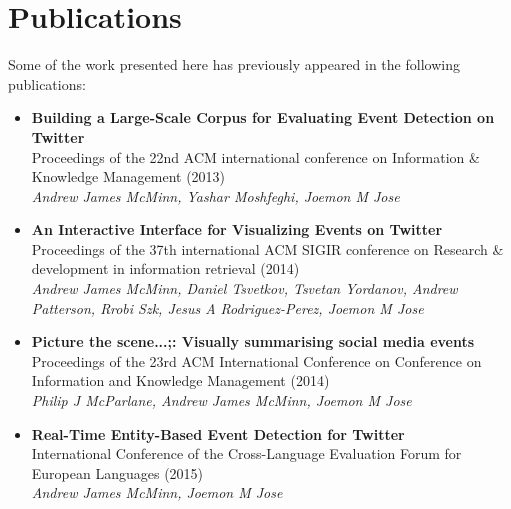 
\chapter*{Publications}
Some of the work presented here  has previously appeared in the following publications:

\bigskip

\begin{itemize}
	\item{
		\textbf{Building a Large-Scale Corpus for Evaluating Event Detection on Twitter}\\
		Proceedings of the 22nd ACM international conference on Information \& Knowledge Management (2013)\\
		\textit{Andrew James McMinn, Yashar Moshfeghi, Joemon M Jose}
	}

	\vspace{0.75cm}

	\item{
		\textbf{An Interactive Interface for Visualizing Events on Twitter}\\
		Proceedings of the 37th international ACM SIGIR conference on Research \& development in information retrieval (2014)\\
		\textit{Andrew James McMinn, Daniel Tsvetkov, Tsvetan Yordanov, Andrew Patterson, Rrobi Szk, Jesus A Rodriguez-Perez, Joemon M Jose}
	}

	\vspace{0.75cm}

	\item{
		\textbf{Picture the scene...;: Visually summarising social media events}\\
		Proceedings of the 23rd ACM International Conference on Conference on Information and Knowledge Management (2014)\\
		\textit{Philip J McParlane, Andrew James McMinn, Joemon M Jose}
	}

	\vspace{0.75cm}

	\item{
		\textbf{Real-Time Entity-Based Event Detection for Twitter}\\
		International Conference of the Cross-Language Evaluation Forum for European Languages (2015)\\
		\textit{Andrew James McMinn, Joemon M Jose}
	}
\end{itemize}
